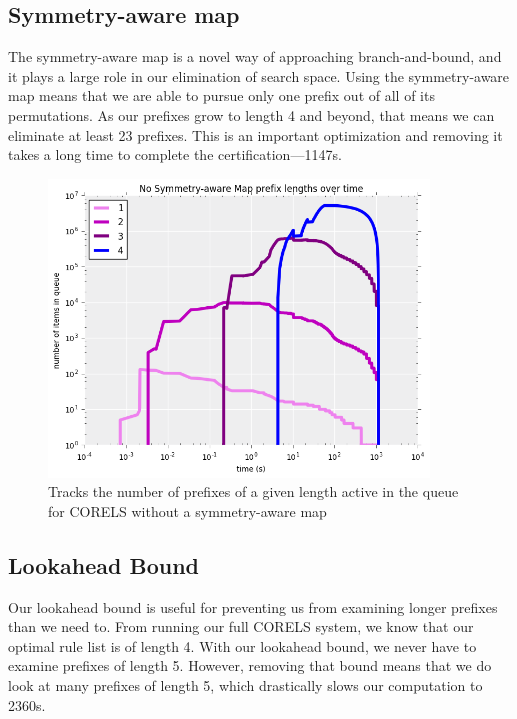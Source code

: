 \subsection{Symmetry-aware map}
\label{exp:ablation-pmap}
The symmetry-aware map is a novel way of approaching branch-and-bound, and it plays a large role in our elimination of search space.
Using the symmetry-aware map means that we are able to pursue only one prefix out of all of its permutations.
As our prefixes grow to length 4 and beyond, that means we can eliminate at least 23 prefixes.
This is an important optimization and removing it takes a long time to complete the certification---1147s.

\begin{figure}[t!]
\begin{center}
\includegraphics[width=0.9\textwidth]{figs/pmap_prefixes.png}
\end{center}
\caption{Tracks the number of prefixes of a given length active in the queue for CORELS without a symmetry-aware map}
\label{fig:pmap-prefixes}
\end{figure}

\subsection{Lookahead Bound}

Our lookahead bound is useful for preventing us from examining longer prefixes than we need to.
From running our full CORELS system, we know that our optimal rule list is of length 4.
With our lookahead bound, we never have to examine prefixes of length 5.
However, removing that bound means that we do look at many prefixes of length 5, which drastically slows our computation to 2360s.

